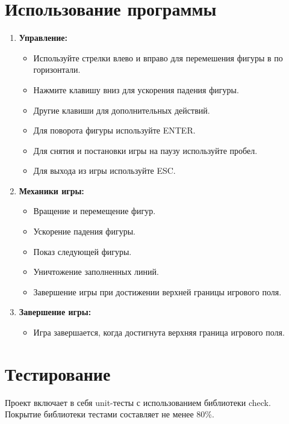 \documentclass{article}
\begin{document}
\section{Использование программы}

\begin{enumerate}
    \item \textbf{Управление:}
        \begin{itemize}
            \item Используйте стрелки влево и вправо для перемешения фигуры в по горизонтали.
            \item Нажмите клавишу вниз для ускорения падения фигуры.
            \item Другие клавиши для дополнительных действий.
            \item Для поворота фигуры используйте ENTER.
            \item Для снятия и постановки игры на паузу используйте пробел.
            \item Для выхода из игры используйте ESC.
        \end{itemize}
    \item \textbf{Механики игры:}
        \begin{itemize}
            \item Вращение и перемещение фигур.
            \item Ускорение падения фигуры.
            \item Показ следующей фигуры.
            \item Уничтожение заполненных линий.
            \item Завершение игры при достижении верхней границы игрового поля.
        \end{itemize}
    \item \textbf{Завершение игры:}
        \begin{itemize}
            \item Игра завершается, когда достигнута верхняя граница игрового поля.
        \end{itemize}
\end{enumerate}

\section{Тестирование}

Проект включает в себя unit-тесты с использованием библиотеки check. Покрытие библиотеки тестами составляет не менее 80\%.
\end{document}
